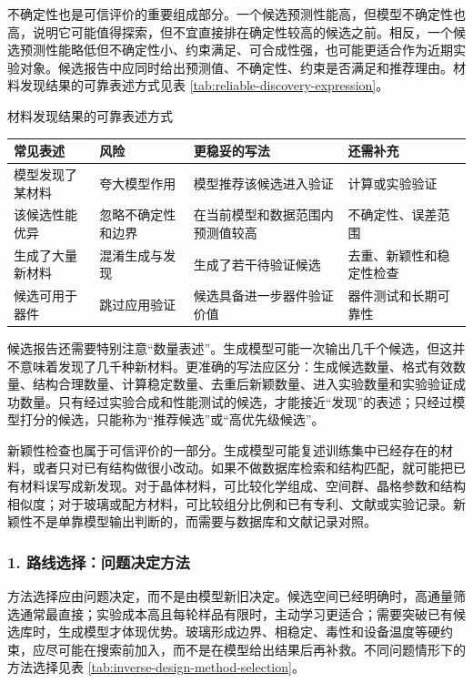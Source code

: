 不确定性也是可信评价的重要组成部分。一个候选预测性能高，但模型不确定性也高，说明它可能值得探索，但不宜直接排在确定性较高的候选之前。相反，一个候选预测性能略低但不确定性小、约束满足、可合成性强，也可能更适合作为近期实验对象。候选报告中应同时给出预测值、不确定性、约束是否满足和推荐理由。材料发现结果的可靠表述方式见表 \ref{tab:reliable-discovery-expression}。

\begin{formalTable}[htbp]
\caption{材料发现结果的可靠表述方式}
\label{tab:reliable-discovery-expression}
\footnotesize
\begin{tabularx}{\textwidth}{@{}YYYY@{}}
\toprule
\textbf{常见表述} & \textbf{风险} & \textbf{更稳妥的写法} & \textbf{还需补充} \\
\midrule
模型发现了某材料 & 夸大模型作用 & 模型推荐该候选进入验证 & 计算或实验验证 \\
该候选性能优异 & 忽略不确定性和边界 & 在当前模型和数据范围内预测值较高 & 不确定性、误差范围 \\
生成了大量新材料 & 混淆生成与发现 & 生成了若干待验证候选 & 去重、新颖性和稳定性检查 \\
候选可用于器件 & 跳过应用验证 & 候选具备进一步器件验证价值 & 器件测试和长期可靠性 \\
\bottomrule
\end{tabularx}
\end{formalTable}

候选报告还需要特别注意“数量表述”。生成模型可能一次输出几千个候选，但这并不意味着发现了几千种新材料。更准确的写法应区分：生成候选数量、格式有效数量、结构合理数量、计算稳定数量、去重后新颖数量、进入实验数量和实验验证成功数量。只有经过实验合成和性能测试的候选，才能接近“发现”的表述；只经过模型打分的候选，只能称为“推荐候选”或“高优先级候选”。

新颖性检查也属于可信评价的一部分。生成模型可能复述训练集中已经存在的材料，或者只对已有结构做很小改动。如果不做数据库检索和结构匹配，就可能把已有材料误写成新发现。对于晶体材料，可比较化学组成、空间群、晶格参数和结构相似度；对于玻璃或配方材料，可比较组分比例和已有专利、文献或实验记录。新颖性不是单靠模型输出判断的，而需要与数据库和文献记录对照。

\subsubsection*{\textbf{1. 路线选择：问题决定方法}}

方法选择应由问题决定，而不是由模型新旧决定。候选空间已经明确时，高通量筛选通常最直接；实验成本高且每轮样品有限时，主动学习更适合；需要突破已有候选库时，生成模型才体现优势。玻璃形成边界、相稳定、毒性和设备温度等硬约束，应尽可能在搜索前加入，而不是在模型给出结果后再补救。不同问题情形下的方法选择见表 \ref{tab:inverse-design-method-selection}。


